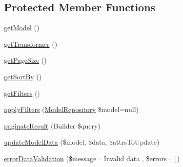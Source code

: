 \subsection*{Protected Member Functions}
\begin{DoxyCompactItemize}
\item 
\hyperlink{classDMA_1_1Friends_1_1Classes_1_1API_1_1BaseResource_acff925772bdea0601cc8c926ca11d51e}{get\+Model} ()
\item 
\hyperlink{classDMA_1_1Friends_1_1Classes_1_1API_1_1BaseResource_a35abd35dbcf2d6cdafc569bb4a574756}{get\+Transformer} ()
\item 
\hyperlink{classDMA_1_1Friends_1_1Classes_1_1API_1_1BaseResource_a2df6de75ae3dd493df1434ce3d873d6a}{get\+Page\+Size} ()
\item 
\hyperlink{classDMA_1_1Friends_1_1Classes_1_1API_1_1BaseResource_a826646a41749725d945ceb2ff08c3852}{get\+Sort\+By} ()
\item 
\hyperlink{classDMA_1_1Friends_1_1Classes_1_1API_1_1BaseResource_a03c357cd8b591ae2b1b915d14a3f3d9f}{get\+Filters} ()
\item 
\hyperlink{classDMA_1_1Friends_1_1Classes_1_1API_1_1BaseResource_a98884c60fd1cd6a4b22b6b549c97e1e1}{apply\+Filters} (\hyperlink{classDMA_1_1Friends_1_1Classes_1_1API_1_1ModelRepository}{Model\+Repository} \$model=null)
\item 
\hyperlink{classDMA_1_1Friends_1_1Classes_1_1API_1_1BaseResource_aed3811d426c80763855a43280f822f97}{paginate\+Result} (Builder \$query)
\item 
\hyperlink{classDMA_1_1Friends_1_1Classes_1_1API_1_1BaseResource_a14f6d0add80bab42202323d70e3c645f}{update\+Model\+Data} (\$model, \$data, \$attrs\+To\+Update)
\item 
\hyperlink{classDMA_1_1Friends_1_1Classes_1_1API_1_1BaseResource_a939517c4026ec51cd9e001c78aa5617d}{error\+Data\+Validation} (\$message= \textquotesingle{}Invalid data \textquotesingle{}, \$errors=\mbox{[}$\,$\mbox{]})
\end{DoxyCompactItemize}
